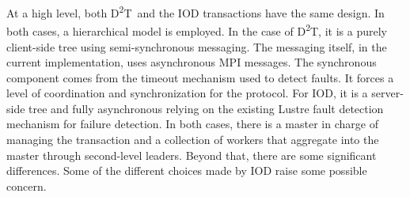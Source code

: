 \documentclass[conference]{IEEEtran}
\newcommand{\DDT}{D\textsuperscript{2}T~}
\newcommand{\DDTns}{D\textsuperscript{2}T}
\begin{document}
%

At a high level, both \DDT and the IOD transactions have the same design. In
both cases, a hierarchical model is employed. In the case of \DDTns, it is a
purely client-side tree using semi-synchronous messaging. The messaging itself,
in the current implementation, uses asynchronous MPI messages. The synchronous
component comes from the timeout mechanism used to detect faults.  It forces a
level of coordination and synchronization for the protocol. For IOD, it is a
server-side tree and fully asynchronous relying on the existing Lustre fault
detection mechanism for failure detection. In both cases, there is a master in
charge of managing the transaction and a collection of workers that aggregate
into the master through second-level leaders. Beyond that, there are some
significant differences. Some of the different choices made by IOD raise some
possible concern.
\end{document}
